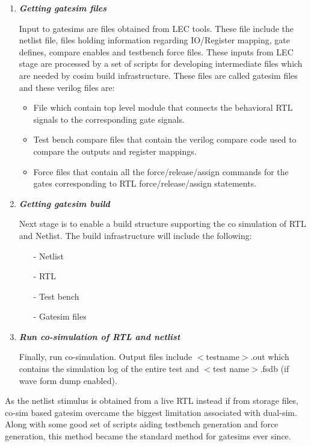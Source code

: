 \begin{enumerate}
	\item \emph{\bf Getting gatesim files}

	Input to gatesims are files obtained from LEC tools. These file include the netlist file, files holding information regarding IO/Register mapping, gate defines, compare enables and testbench force files. These inputs from LEC stage are processed by a set of scripts for developing intermediate files which are needed by cosim build infrastructure. These files are called gatesim files and these verilog files are:
	\begin{itemize}
		\item File which contain top level module that connects the behavioral RTL signals to the corresponding gate signals.
		\item Test bench compare files that contain the verilog compare code used to compare the outputs and register mappings.
		\item Force files that contain all the force/release/assign commands for the gates corresponding to RTL force/release/assign statements.
	\end{itemize}

	\item \emph{\bf Getting gatesim build} 

	Next stage is to enable a build structure supporting the co simulation of RTL and Netlist. The build infrastructure will include the following:
	\begin{itemize}
		\item[-]Netlist
		\item[-]RTL
		\item[-]Test bench
		\item[-]Gatesim files
	\end{itemize}

	\item \emph{\bf Run co-simulation of RTL and netlist}

	Finally, run co-simulation. Output files include $<$testname$>$.out which contains the simulation log of the entire test and $<$test name$>$.fsdb (if wave form dump enabled).
\end{enumerate}


As the netlist stimulus is obtained from a live RTL instead if from storage files, co-sim based gatesim overcame the biggest limitation associated with dual-sim. Along with some good set of scripts aiding testbench generation and force generation, this method became the standard method for gatesims ever since.

